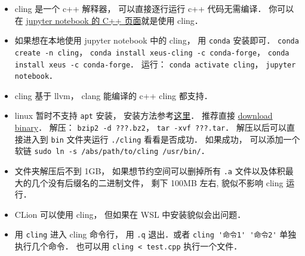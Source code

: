 
\begin{issues}
\issueDraft
\end{issues}

\begin{itemize}
\item cling 是一个 c++ 解释器， 可以直接逐行运行 c++ 代码无需编译． 你可以在 \href{https://jupyter.org/try}{jupyter notebook 的 C++ 页面}就是使用 cling．
\item 如果想在本地使用 jupyter notebook 中的 cling， 用 \verb|conda| 安装即可． \verb|conda create -n cling|， \verb|conda install xeus-cling -c conda-forge|， \verb|conda install xeus -c conda-forge|． 运行： \verb|conda activate cling|， \verb|jupyter notebook|．
\item cling 基于 llvm， clang 能编译的 c++ cling 都支持．
\item linux 暂时不支持 \verb|apt| 安装， 安装方法参考\href{https://kaustubh13.medium.com/how-to-install-cling-on-linux-or-wsl-8125798ed9b9}{这里}． 推荐直接 \href{https://root.cern/download/cling/}{download binary}． 解压： \verb|bzip2 -d ???.bz2|， \verb|tar -xvf ???.tar|． 解压以后可以直接进入到 \verb|bin| 文件夹运行 \verb|./cling| 看看是否成功． 如果成功， 可以添加一个软链 \verb|sudo ln -s /abs/path/to/cling /usr/bin/|．
\item 文件夹解压后不到 1GB， 如果想节约空间可以删掉所有 \verb|.a| 文件以及体积最大的几个没有后缀名的二进制文件， 剩下 100MB 左右, 貌似不影响 cling 运行．
\item CLion 可以使用 cling， 但如果在 WSL 中安装貌似会出问题．
\item 用 \verb|cling| 进入 cling 命令行， 用 \verb|.q| 退出．或者 \verb|cling '命令1' '命令2'| 单独执行几个命令． 也可以用 \verb|cling < test.cpp| 执行一个文件．
\end{itemize}
